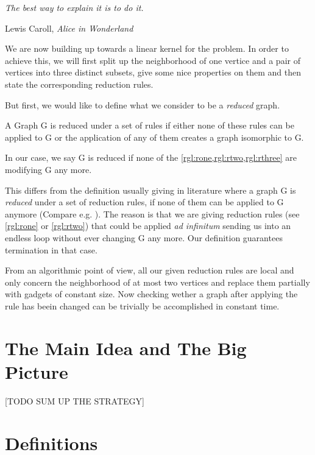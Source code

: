 \epigraph{\itshape The best way to explain it is to do it.}{Lewis Caroll, \textit{Alice in Wonderland}}

We are now building up towards a linear kernel for the \sdom problem. In order to achieve this, we will first split up the neighborhood of one vertice and a pair of vertices into three distinct subsets, give some nice properties on them and then state the corresponding reduction rules.  



But first, we would like to define what we consider to be a \textit{reduced} graph. 

\begin{definition}
    A Graph G is reduced under a set of rules if either none of these rules can be applied to G or the application of any of them creates a graph isomorphic to G.
\end{definition}

In our case, we say G is reduced if none of the \cref{rgl:rone,rgl:rtwo,rgl:rthree} are modifying G any more.

This differs from the definition usually giving in literature where a graph G is \textit{reduced} under a set of reduction rules, if none of them can be applied to G anymore (Compare e.g. \cite{Fomin2019}). The reason is that we are giving reduction rules (see \cref{rgl:rone} or \cref{rgl:rtwo}) that could be applied \textit{ad infinitum} sending us into an endless loop without ever changing G any more. Our definition guarantees termination in that case.

From an algorithmic point of view, all our given reduction rules are local and only concern the neighborhood of at most two vertices and replace them partially with gadgets of constant size. Now checking wether a graph after applying the rule has beein changed can be trivially be accomplished in constant time.

\section{The Main Idea and The Big Picture}

[TODO SUM UP THE STRATEGY]


\section{Definitions}

